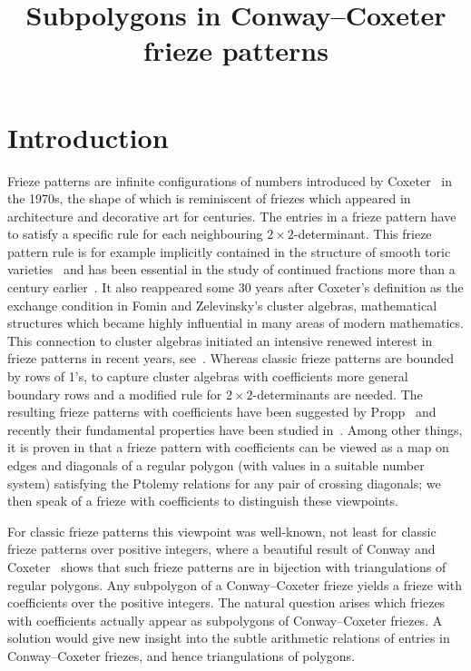\documentclass[ALCO,ThmDefs,Unicode,epreuves,published]{cedram}
\author{\firstname{Michael} \lastname{Cuntz}}
\author{\firstname{Thorsten} \lastname{Holm}}
\title[Subpolygons in Conway--Coxeter frieze patterns]
{Subpolygons in Conway--Coxeter frieze patterns}
\numberwithin{equation}{section}
\begin{document}
\maketitle

\section{Introduction}

Frieze patterns are infinite configurations of numbers introduced by
Coxeter~\cite{Cox71} in the 1970s, the shape of which is reminiscent of 
friezes which appeared in architecture and decorative art for centuries.
The entries in a frieze pattern have to satisfy a specific rule for each
neighbouring $2\times 2$-determinant. This frieze pattern rule is for example implicitly contained in the structure of smooth toric varieties~\cite[1.6]{Oda} and has been essential in the study of continued fractions more than a century earlier~\cite[\S~51]{b-Perron29}.
It also reappeared some 30 years after Coxeter's definition as the exchange condition in Fomin and Zelevinsky's 
cluster algebras, mathematical structures
which became highly influential in many areas of modern 
mathematics. This connection to cluster algebras initiated an intensive 
renewed interest in frieze patterns in recent years, see~\cite{MG15}. Whereas classic frieze
patterns are bounded by rows of 1's, to capture cluster algebras with 
coefficients more general boundary rows and a modified rule for 
$2\times 2$-determinants are needed. The resulting frieze patterns with coefficients
have been suggested by Propp~\cite{Propp} and recently their fundamental
properties have been studied in~\cite{CHJ}. Among other things, it is proven in
\cite{CHJ} that a frieze pattern with coefficients can be viewed as a map on 
edges and diagonals of a regular polygon (with values in a suitable number
system) satisfying the Ptolemy relations for any pair of crossing diagonals;
we then speak of a frieze with coefficients to distinguish these viewpoints.

For classic frieze patterns this viewpoint was well-known, not least for 
classic frieze patterns over positive integers, where a beautiful result of
Conway and Coxeter~\cite{CC73} shows that such frieze patterns are in 
bijection with triangulations of regular polygons.
Any subpolygon of a Conway--Coxeter frieze yields a 
frieze with coefficients over the positive integers. The natural question
arises which friezes with coefficients actually appear as subpolygons of 
Conway--Coxeter friezes. A solution would give new insight into the subtle
arithmetic relations of entries in Conway--Coxeter friezes, and hence 
triangulations of polygons. 
\end{document}
